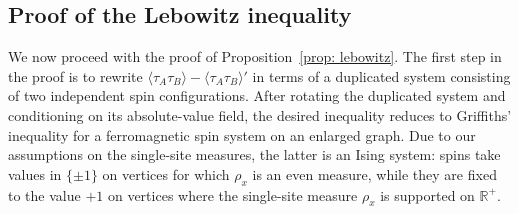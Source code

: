 \documentclass[11pt,a4paper]{article}
\numberwithin{equation}{section}
\theoremstyle{plain}
\theoremstyle{definition}
\begin{document}
\subsection{Proof of the Lebowitz inequality}


We now proceed with the proof of Proposition~\ref{prop: lebowitz}. The first step in the proof is to rewrite $\langle \tau_A \tau_B \rangle - \langle \tau_A \tau_B \rangle'$ in terms of a duplicated system consisting of two independent spin configurations. After rotating the duplicated system and conditioning on its absolute-value field, the desired inequality reduces to Griffiths' inequality for a ferromagnetic spin system on an enlarged graph. Due to our assumptions on the single-site measures, the latter is an Ising system: spins take values in $\{\pm 1\}$ on vertices for which $\rho_x$ is an even measure, while they are fixed to the value $+1$ on vertices where the single-site measure $\rho_x$ is supported on $\mathbb{R}^+$.
\end{document}
